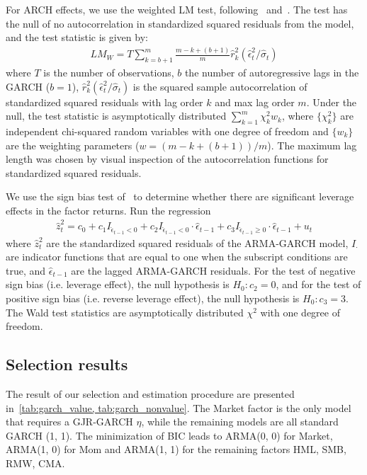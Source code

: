 For ARCH effects, we use the weighted LM test, following~\textcite{FisherGallagher2012} and~\textcite{LiMak1994}. The test has the null of no autocorrelation in standardized squared residuals from the model, and the test statistic is given by:
\begin{align}
	LM_W = T \sum\limits_{k = b + 1}^{m} \frac{m - k + (b+1)}{m} \hat{r}^{2}_{k} (\hat{\epsilon}^{2}_{t} / \hat{\sigma}_{t})
\end{align}
where $T$ is the number of observations, $b$ the number of autoregressive lags in the GARCH ($b=1$), $\hat{r}^2_k (\hat{\epsilon}^2_t / \hat{\sigma}_t)$ is the squared sample autocorrelation of standardized squared residuals with lag order $k$ and max lag order $m$. Under the null, the test statistic is asymptotically distributed $\sum\limits^m_{k = 1} \chi^2_k w_k$, where $\{\chi^2_k\}$ are independent chi-squared random variables with one degree of freedom and $\{w_k\}$ are the weighting parameters ($w = (m - k + (b+1))/m$). The maximum lag length was chosen by visual inspection of the autocorrelation functions for standardized squared residuals.

We use the sign bias test of~\textcite{EngleNg1993} to determine whether there are significant leverage effects in the factor returns. Run the regression
\begin{align}
	\hat{z}_t^2 = c_0 + c_1 I_{\hat{\epsilon}_{t-1} < 0} + c_2 I_{\hat{\epsilon}_{t-1} < 0} \cdot \hat{\epsilon}_{t-1} + c_3 I_{\hat{\epsilon}_{t-1} \geq 0} \cdot \hat{\epsilon}_{t-1} + u_t
\end{align}
where $\hat{z}_t^2$ are the standardized squared residuals of the ARMA-GARCH model, $I_\cdot$ are indicator functions that are equal to one when the subscript conditions are true, and $\hat{\epsilon}_{t-1}$ are the lagged ARMA-GARCH residuals. For the test of negative sign bias (i.e. leverage effect), the null hypothesis is $H_0: c_2 = 0$, and for the test of positive sign bias (i.e. reverse leverage effect), the null hypothesis is $H_0: c_3 = 3$. The Wald test statistics are asymptotically distributed $\chi^2$ with one degree of freedom.


\subsection{Selection results}
\label{sub:selection_results}

The result of our selection and estimation procedure are presented in~\autoref{tab:garch_value, tab:garch_nonvalue}. The Market factor is the only model that requires a GJR-GARCH $\eta$, while the remaining models are all standard GARCH (1, 1). The minimization of BIC leads to ARMA(0, 0) for Market, ARMA(1, 0) for Mom and ARMA(1, 1) for the remaining factors HML, SMB, RMW, CMA. 

